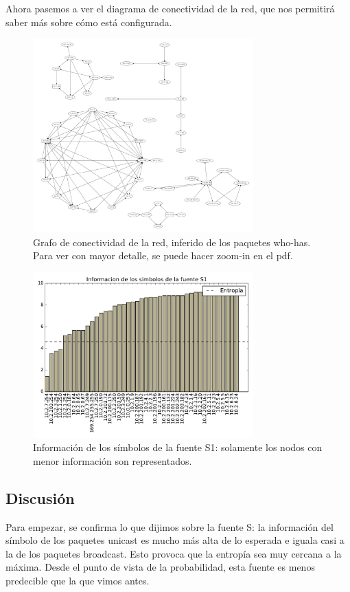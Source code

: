 Ahora pasemos a ver el diagrama de conectividad de la red, que nos permitirá saber más sobre cómo está configurada.

\begin{figure}[H]
  \centering
  \includegraphics[width=8.5cm]{exp_labo/grafico2.pdf}
  \caption{  \normalfont Grafo de conectividad de la red, inferido de los paquetes who-has. Para ver con mayor detalle, se puede hacer zoom-in en el pdf. }
\end{figure}


\begin{figure}[H]
  \centering
  \includegraphics[width=8.5cm]{exp_labo/grafico3.pdf}
  \caption{ \normalfont Información de los símbolos de la fuente S1: solamente los nodos con menor información son representados.}
\end{figure}

\subsection{Discusión}

Para empezar, se confirma lo que dijimos sobre la fuente S: la información del símbolo de los paquetes unicast es mucho más alta de lo esperada e iguala casi a la de los paquetes broadcast. Esto provoca que la entropía sea muy cercana a la máxima. Desde el punto de vista de la probabilidad, esta fuente es menos predecible que la que vimos antes.

